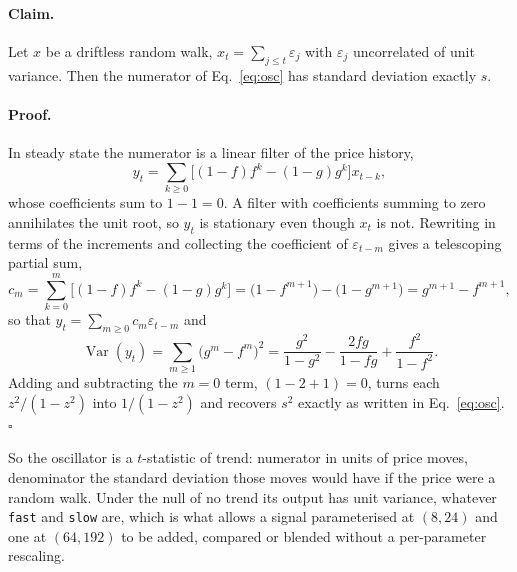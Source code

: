 \documentclass[11pt,a4paper]{article}
\newcommand{\code}[1]{\texttt{#1}}
\begin{document}
\paragraph{Claim.}
Let $x$ be a driftless random walk, $x_t = \sum_{j \le t} \varepsilon_j$ with
$\varepsilon_j$ uncorrelated of unit variance. Then the numerator of
Eq.~\eqref{eq:osc} has standard deviation exactly $s$.

\paragraph{Proof.}
In steady state the numerator is a linear filter of the price history,
\begin{equation}
  y_t = \sum_{k \ge 0} \bigl[ (1-f)f^k - (1-g)g^k \bigr] x_{t-k},
\end{equation}
whose coefficients sum to $1 - 1 = 0$. A filter with coefficients summing to zero
annihilates the unit root, so $y_t$ is stationary even though $x_t$ is not.
Rewriting in terms of the increments and collecting the coefficient of
$\varepsilon_{t-m}$ gives a telescoping partial sum,
\begin{equation}
  c_m = \sum_{k=0}^{m} \bigl[ (1-f)f^k - (1-g)g^k \bigr]
      = \bigl(1 - f^{m+1}\bigr) - \bigl(1 - g^{m+1}\bigr)
      = g^{m+1} - f^{m+1},
\end{equation}
so that $y_t = \sum_{m \ge 0} c_m \varepsilon_{t-m}$ and
\begin{equation}
  \operatorname{Var}(y_t)
  = \sum_{m \ge 1} \bigl( g^{m} - f^{m} \bigr)^2
  = \frac{g^2}{1-g^2} - \frac{2fg}{1-fg} + \frac{f^2}{1-f^2} .
\end{equation}
Adding and subtracting the $m=0$ term, $(1 - 2 + 1) = 0$, turns each
$z^2/(1-z^2)$ into $1/(1-z^2)$ and recovers $s^2$ exactly as written in
Eq.~\eqref{eq:osc}. \hfill$\square$

So the oscillator is a $t$-statistic of trend: numerator in units of price
moves, denominator the standard deviation those moves would have if the price
were a random walk. Under the null of no trend its output has unit variance,
whatever \code{fast} and \code{slow} are, which is what allows a signal
parameterised at $(8, 24)$ and one at $(64, 192)$ to be added, compared or
blended without a per-parameter rescaling.
\end{document}
